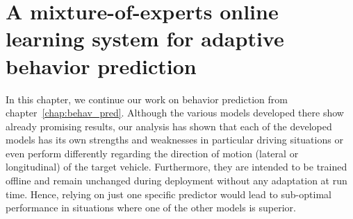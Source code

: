 \chapter{A mixture-of-experts online learning system for adaptive behavior prediction}
\label{chap:mix_online_learning}

In this chapter, we continue our work on behavior prediction from chapter~\ref{chap:behav_pred}.
Although the various models developed there show already promising results, our analysis has shown that each of the developed models has its own strengths and weaknesses in particular driving situations or even perform differently regarding the direction of motion (lateral or longitudinal) of the target vehicle.
Furthermore, they are intended to be trained offline and remain unchanged during deployment without any adaptation at run time.
Hence, relying on just one specific predictor would lead to sub-optimal performance in situations where one of the other models is superior.

